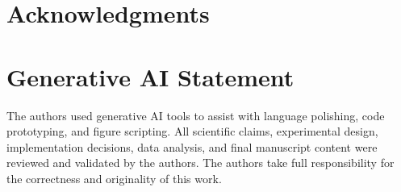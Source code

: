 \documentclass[runningheads]{llncs}
\begin{document}
\section*{Acknowledgments}

\section*{Generative AI Statement}
The authors used generative AI tools to assist with language polishing, code prototyping, and figure scripting. All scientific claims, experimental design, implementation decisions, data analysis, and final manuscript content were reviewed and validated by the authors. The authors take full responsibility for the correctness and originality of this work.



\end{document}
